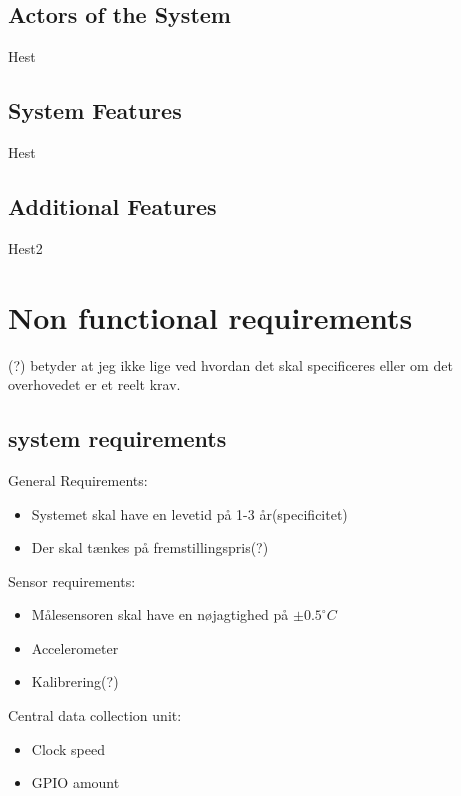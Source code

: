 \subsection{Actors of the System}
Hest

\subsection{System Features}
Hest

\subsection{Additional Features}
Hest2

\section{Non functional requirements}
(?) betyder at jeg ikke lige ved hvordan det skal specificeres eller om det overhovedet er et reelt krav.\\
\subsection{system requirements }
General Requirements:\\
\begin{itemize}
\item Systemet skal have en levetid på 1-3 år(specificitet)
\item Der skal tænkes på fremstillingspris(?)
\end{itemize}
Sensor requirements:\\
\begin{itemize}
\item Målesensoren skal have en nøjagtighed på $\pm0.5 ^{\circ}C$
\item Accelerometer
\item Kalibrering(?)
\end{itemize}
Central data collection unit:\\
\begin{itemize}
\item Clock speed
\item GPIO amount
\end{itemize}


